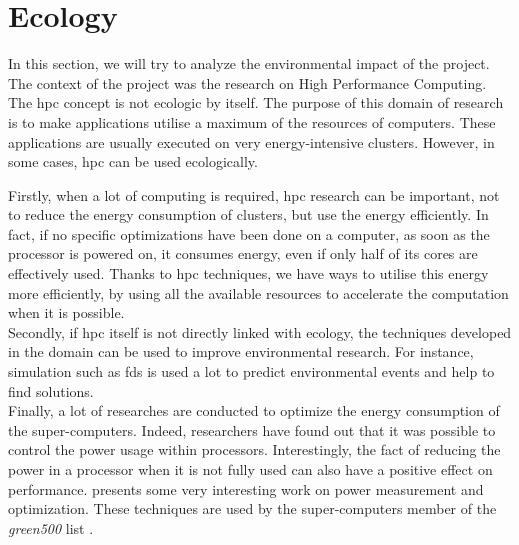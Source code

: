 
\clearpage{}
\section{Ecology}

In this section, we will try to analyze the environmental impact of the
project.\\

The context of the project was the research on High Performance Computing. The
\gls{hpc} concept is not ecologic by itself. The purpose of this domain of
research is to make applications utilise a maximum of the resources of
computers. These applications are usually executed on very energy-intensive
clusters. However, in some cases, \gls{hpc} can be used ecologically.

Firstly, when a lot of computing is required, \gls{hpc} research can be
important, not to reduce the energy consumption of clusters, but use the energy
efficiently. In fact, if no specific optimizations have been done on a computer,
as soon as the processor is powered on, it consumes energy, even if only half of
its cores are effectively used. Thanks to \gls{hpc} techniques, we have ways to
utilise this energy more efficiently, by using all the available resources to
accelerate the computation when it is possible.\\

Secondly, if \gls{hpc} itself is not directly linked with ecology, the
techniques developed in the domain can be used to improve environmental
research. For instance, simulation such as \gls{fds} is used a lot to predict
environmental events and help to find solutions.\\

Finally, a lot of researches are conducted to optimize the energy consumption of
the super-computers. Indeed, researchers have found out that it was possible to
control the power usage within processors. Interestingly, the fact of reducing
the power in a processor when it is not fully used can also have a positive
effect on performance. \cite{song2009energy} presents some very interesting work
on power measurement and optimization. These techniques are used by the
super-computers member of the \textit{green500} list \cite{enwiki:1230059074}.\\
